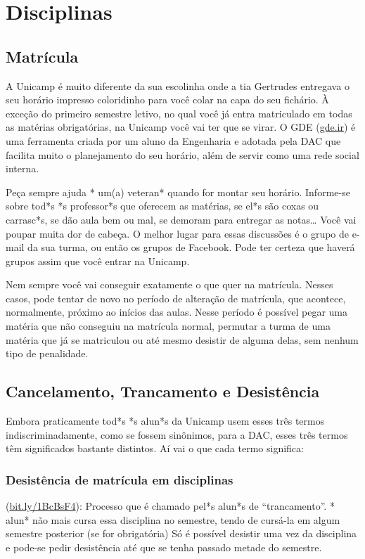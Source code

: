 
\section{Disciplinas}

\subsection{Matrícula}

A Unicamp é muito diferente da sua escolinha onde a tia Gertrudes entregava o
seu horário impresso coloridinho para você colar na capa do seu fichário.  À
exceção do primeiro semestre letivo, no qual você já entra matriculado em todas
as matérias obrigatórias, na Unicamp você vai ter que se virar.  O GDE
(\url{gde.ir}) é uma ferramenta criada por um aluno da Engenharia e adotada pela
DAC que facilita muito o planejamento do seu horário, além de servir como uma
rede social interna.

Peça sempre ajuda * um(a) veteran* quando for montar seu horário. Informe-se
sobre tod*s *s professor*s que oferecem as matérias, se el*s são coxas ou
carrasc*s, se dão aula bem ou mal, se demoram para entregar as notas{\dots} Você vai
poupar muita dor de cabeça. O melhor lugar para essas discussões é o grupo de
e-mail da sua turma, ou então os grupos de Facebook. Pode ter certeza que haverá
grupos assim que você entrar na Unicamp.

Nem sempre você vai conseguir exatamente o que quer na matrícula. Nesses casos, 
pode tentar de novo no período de alteração de matrícula, que acontece, 
normalmente, próximo ao inícios das aulas. Nesse período é
possível pegar uma matéria que não conseguiu na matrícula normal, permutar
a turma de uma matéria que já se matriculou ou até mesmo desistir de alguma
delas, sem nenhum tipo de penalidade.

\subsection{Cancelamento, Trancamento e Desistência}

Embora praticamente tod*s *s alun*s da Unicamp usem esses três termos
indiscriminadamente, como se fossem sinônimos, para a DAC, esses três termos têm
significados bastante distintos. Aí vai o que cada termo significa:

\subsubsection{Desistência de matrícula em disciplinas}
(\url{bit.ly/1BcBsF4}): Processo que é chamado pel*s alun*s de
``trancamento''.  * alun* não mais cursa essa disciplina no semestre, tendo de
cursá-la em algum semestre posterior (se for obrigatória) Só é possível desistir
uma vez da disciplina e pode-se pedir desistência até que se tenha passado
metade do semestre.
